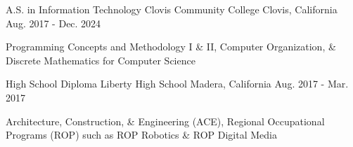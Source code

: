 

\begin{cventries}

  \cventry
    {A.S. in Information Technology} %
    {Clovis Community College} %
    {Clovis, California} %
    {Aug. 2017 - Dec. 2024} %
    {
      \begin{cvitems} %
	  \item {Programming Concepts and Methodology I \& II, Computer Organization, \& Discrete Mathematics for Computer Science}
      \end{cvitems}
    }

  \cventry
    {High School Diploma} %
    {Liberty High School} %
    {Madera, California} %
    {Aug. 2017 - Mar. 2017} %
    {
      \begin{cvitems} %
	  \item {Architecture, Construction, \& Engineering (ACE), Regional Occupational Programs (ROP) such as ROP Robotics \& ROP Digital Media}
      \end{cvitems}
    }

\end{cventries}
